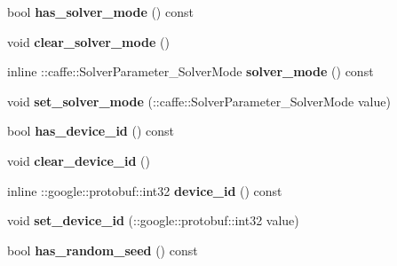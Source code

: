 \begin{DoxyCompactItemize}
\mbox{\label{classcaffe_1_1_solver_parameter_a3e1717037cb81128d62acbc8546a704b}} 
bool {\bfseries has\+\_\+solver\+\_\+mode} () const
\item 
\mbox{\label{classcaffe_1_1_solver_parameter_a11ae2631505425086cb3a09833152708}} 
void {\bfseries clear\+\_\+solver\+\_\+mode} ()
\item 
\mbox{\label{classcaffe_1_1_solver_parameter_a2de27c5e406f644abec7fe9e19b861c3}} 
inline \+::caffe\+::\+Solver\+Parameter\+\_\+\+Solver\+Mode {\bfseries solver\+\_\+mode} () const
\item 
\mbox{\label{classcaffe_1_1_solver_parameter_a1929786a7f10ec9c77cdea5b89ba26e0}} 
void {\bfseries set\+\_\+solver\+\_\+mode} (\+::caffe\+::\+Solver\+Parameter\+\_\+\+Solver\+Mode value)
\item 
\mbox{\label{classcaffe_1_1_solver_parameter_a05edd682c576006366edf832f2bf859e}} 
bool {\bfseries has\+\_\+device\+\_\+id} () const
\item 
\mbox{\label{classcaffe_1_1_solver_parameter_a004536bcdae2cdfe28b7ff8a2be8d656}} 
void {\bfseries clear\+\_\+device\+\_\+id} ()
\item 
\mbox{\label{classcaffe_1_1_solver_parameter_ae07f2d74927b917ed557504ad65a6b89}} 
inline \+::google\+::protobuf\+::int32 {\bfseries device\+\_\+id} () const
\item 
\mbox{\label{classcaffe_1_1_solver_parameter_ade8967628844768eee0dba7fbdc9137c}} 
void {\bfseries set\+\_\+device\+\_\+id} (\+::google\+::protobuf\+::int32 value)
\item 
\mbox{\label{classcaffe_1_1_solver_parameter_a6536f2e7d2fd9758268b71bfae5d0add}} 
bool {\bfseries has\+\_\+random\+\_\+seed} () const
\item 
\mbox{\label{classcaffe_1_1_solver_parameter_a014f6e9f5b73d0192b151cd63b22d8d1}} 

\end{DoxyCompactItemize}
